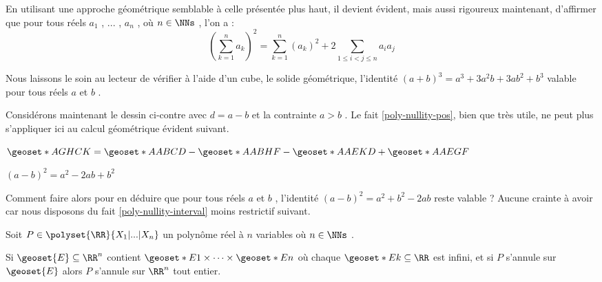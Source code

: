 

\begin{example}
	En utilisant une approche géométrique semblable à celle présentée plus haut, il devient évident, mais aussi rigoureux maintenant, d'affirmer que pour tous réels $a_1$ , ... , $a_n$ , où $n \in \NNs$ , l'on a :
\[
	\left( \sum_{k=1}^{n}a_k \right)^2
	=
	\sum_{k=1}^{n} \left( a_k \right)^2
	+
	2 \sum_{1 \leq i < j \leq n} a_i a_j
\]
\end{example}




\begin{example}
	Nous laissons le soin au lecteur de vérifier à l'aide d'un cube, le solide géométrique, l'identité $(a + b)^3 = a^3 + 3 a^2 b + 3 a b^2 + b^3$ valable pour tous réels $a$ et $b$ .
\end{example}




\medskip


\begin{figure} 
	\vspace{-.5em}
	\begin{center}
	\end{center}
	\vspace{-1.25em}
\end{figure} 


Considérons maintenant le dessin ci-contre avec $d = a - b$ et la contrainte $a > b$ . Le fait \ref{poly-nullity-pos}, bien que très utile, ne peut plus s'appliquer ici au calcul géométrique évident suivant.

\smallskip

$\geoset*{A}{GHCK} = \geoset*{A}{ABCD} - \geoset*{A}{ABHF} - \geoset*{A}{AEKD} + \geoset*{A}{AEGF}$
	
\smallskip
	
$(a-b)^2 = a^2 - 2ab + b^2$


\medskip

Comment faire alors pour en déduire que pour tous réels $a$ et $b$ , l'identité $(a - b)^2 = a^2 + b^2 - 2ab$ reste valable ?
Aucune crainte à avoir car nous disposons du fait \ref{poly-nullity-interval} moins restrictif suivant. 


\medskip

\begin{fact} \label{poly-nullity-interval}
	Soit $P \in \polyset{\RR}{X_1 | ... | X_n}$ un polynôme réel à $n$ variables où $n \in \NNs$ .
	
	\smallskip
	
	Si $\geoset{E} \subseteq \RR^n$ contient $\geoset*{E}{1} \times \cdots \times \geoset*{E}{n}$ où chaque $\geoset*{E}{k} \subseteq \RR$ est infini,
	et si $P$ s'annule sur $\geoset{E}$ alors $P$ s'annule sur $\RR^n$ tout entier. 
\end{fact}


